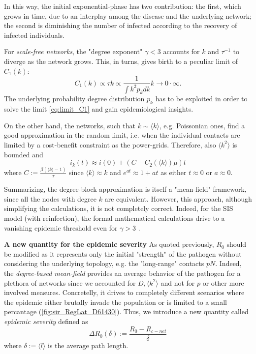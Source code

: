 \documentclass[a4paper,10pt,twoside]{book} %
\theoremstyle{definition}
\begin{document}
In this way, the initial exponential-phase has two contribution: the first, which grows in time, due to an interplay among the disease and the underlying network; the second is diminishing the number of infected according to the recovery of infected individuals.

For \textit{scale-free networks}, the "degree exponent" $\gamma<3$ accounts for $k$ and $\tau^{-1}$ to diverge as the network grows. This, in turns, gives birth to a peculiar limit of $C_1(k)$: \vspace{3mm}
\begin{equation}
	C_1(k)\propto \tau k \propto \frac{1}{\int k^2 p_k dk}k  \to 0 \cdot \infty.
	\label{eq:limit_C1}
\end{equation}
The underlying probability degree distribution $p_k$ has to be exploited in order to solve the limit \autoref{eq:limit_C1} and gain epidemiological insights.

On the other hand, the networks, such that $k \sim \langle k \rangle$, e.g. Poissonian ones, find a good approximation in the random limit, i.e. when the individual contacts are limited by a cost-benefit constraint as the power-grids. Therefore, also $\langle k^2 \rangle $ is bounded and
\begin{equation}
	i_k(t) \approx i(0)  + \left(C - C_2(\langle k \rangle )\mu \right) t
\end{equation}
where $C:= \frac{\beta (\langle k \rangle -1)}{\tau}$ since $\langle k \rangle \approx k$ and $e^{at}\approx1+at$ as either $t\approx0$ or $a \approx 0$.

Summarizing, the degree-block approximation is itself a "mean-field" framework, since all the nodes with degree $k$  are equivalent. However, this approach, although simplifying the calculations, it is not completely correct. Indeed, for the SIS model (with reinfection), the formal mathematical calculations drive to a vanishing epidemic threshold even for $\gamma>3$ \cite{barabasi::2016networkbook}.

\textbf{A new quantity for the epidemic severity} 
\label{sec:def_epidemic_severity}
As quoted previously, $R_0$ should be modified as it represents only the initial "strength" of the pathogen without considering the underlying topology, e.g. the "long-range" contacts $pN$. Indeed, the \textit{degree-based mean-field} provides an average behavior of the pathogen for a plethora of networks since we accounted for $D, \langle k^2 \rangle$ and not for $ p$ or other more involved measures. Concretelly, it drives to completely different scenarios where the epidemic either brutally invade the population or is limited to a small percantage (\autoref{fig:sir_RegLat_D61430}). Thus, we introduce a new quantity called \textit{epidemic severity} defined as
\begin{equation}
	\Delta R_0 (\delta):= \frac{R_0 - R_{c-net}}{\delta}
	\label{eq:def_DR0delta}
\end{equation}
where $\delta:=\langle l \rangle $ is the average path length.
\end{document}

